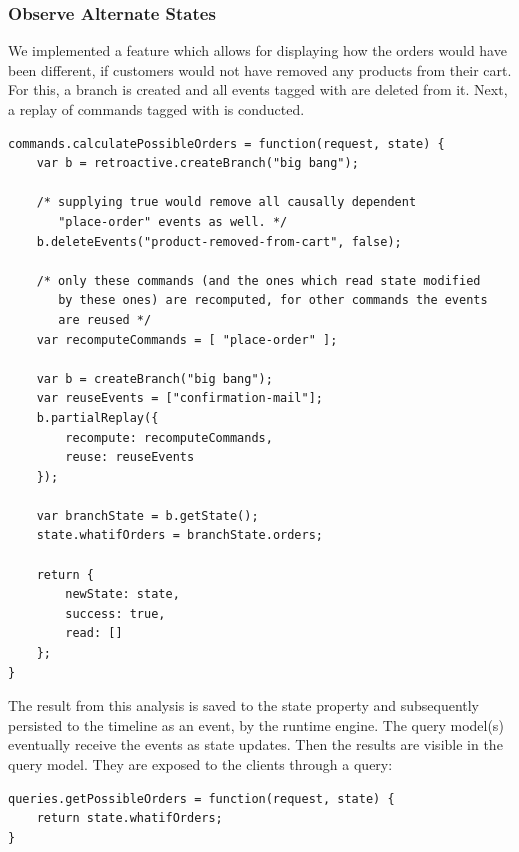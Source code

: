 \subsubsection{Observe Alternate States}
We implemented a feature which allows for displaying how the orders would have 
been different, if customers would not have removed any products from their cart.
For this, a branch is created and all events tagged with  
are deleted from it. Next, a replay of commands tagged with  
is conducted.

\begin{lstlisting}[style=styled]
commands.calculatePossibleOrders = function(request, state) {
	var b = retroactive.createBranch("big bang");

	/* supplying true would remove all causally dependent 
	   "place-order" events as well. */
	b.deleteEvents("product-removed-from-cart", false);

	/* only these commands (and the ones which read state modified 
	   by these ones) are recomputed, for other commands the events 
	   are reused */
	var recomputeCommands = [ "place-order" ];

	var b = createBranch("big bang");
	var reuseEvents = ["confirmation-mail"];
	b.partialReplay({ 
		recompute: recomputeCommands, 
		reuse: reuseEvents 
	});

	var branchState = b.getState();
	state.whatifOrders = branchState.orders;

	return {
		newState: state,
		success: true,
		read: []
	};
}
\end{lstlisting}

The result from this analysis is saved to the state property  
and subsequently persisted to the timeline as an event, by the runtime engine.
The query model(s) eventually receive the events as state updates. Then the 
results are visible in the query model. They are exposed to the clients through 
a query:

\begin{lstlisting}[style=styled]
queries.getPossibleOrders = function(request, state) {
	return state.whatifOrders;
}
\end{lstlisting}

